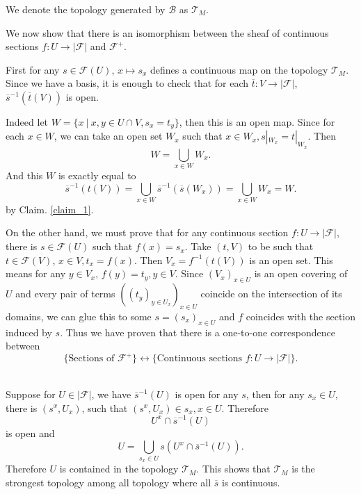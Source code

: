 \documentclass{article}
\begin{document}
We denote the topology generated by $\mathcal{B}$ as $\mathcal{T}_M$.\\
\par We now show that there is an isomorphism between the sheaf of continuous sections $f:U\to\vert\mathcal{F}\vert$ and $\mathcal{F}^+$.\\
\par First for any $s\in\mathcal{F}(U)$, $x\mapsto s_x$ defines a continuous map on the topology $\mathcal{T}_M$. Since we have a basis, it is enough to check that for each $\overline{t}:V\to\vert\mathcal{F}\vert$, $\overline{s}^{-1}(\overline{t}(V))$ is open. \\
\par Indeed let $W = \{x\:|\: x,y\in U\cap V, s_x=t_y\}$, then this is an open map. Since for each $x\in W$, we can take an open set $W_x$ such that $x\in W_x, s|_{W_x}=t|_{W_x}$. Then
\begin{equation*}
W = \bigcup_{x\in W}W_x.
\end{equation*}
And this $W$ is exactly equal to 
\begin{equation*}
\overline{s}^{-1}(t(V))=\bigcup_{x\in W}\overline{s}^{-1}(\overline{s}(W_x)) = \bigcup_{x\in W}W_x=W. 
\end{equation*}
by Claim. \ref{claim_1}.
\par On the other hand, we must prove that for any continuous section $f:U\to\vert\mathcal{F}\vert$, there is $s\in\mathcal{F}(U)$ such that $f(x) = s_x$. Take $(t,V)$ to be such that $t\in\mathcal{F}(V)$, $x\in V, t_x=f(x)$. Then $V_x=f^{-1}(t(V))$ is an open set. This means for any $y\in V_x$, $f(y)=t_y, y\in V$. Since $(V_x)_{x\in U}$ is an open covering of $U$ and every pair of  terms $((t_y)_{y\in U_x})_{x\in U}$ coincide on the intersection of its domains, we can glue this to some $s=(s_x)_{x\in U}$ and $f$ coincides with the section induced by $s$. Thus we have proven that there is a one-to-one correspondence between 
\begin{equation*}
\{\text{Sections of }\mathcal{F}^+\}\leftrightarrow\{\text{Continuous sections }f:U\to\vert\mathcal{F}\vert\}.
\end{equation*}\\

\par Suppose for $U\in\vert\mathcal{F}\vert$, we have $\overline{s}^{-1}(U)$ is open for any $s$, then for any $s_x\in U$, there is $(s^x,U_x)$, such that $(s^x,U_x)\in s_x,x\in U$. Therefore 
\begin{equation*}
U^x\cap \overline{s}^{-1}(U)
\end{equation*}
is open and 
\begin{equation*}
U=\bigcup_{s_x\in U}s(U^x\cap \overline{s}^{-1}(U)).
\end{equation*}
Therefore $U$ is contained in the topology $\mathcal{T}_M$. This shows that $\mathcal{T}_M$ is the strongest topology among all topology where all $\overline{s}$ is continuous.
\end{document}
